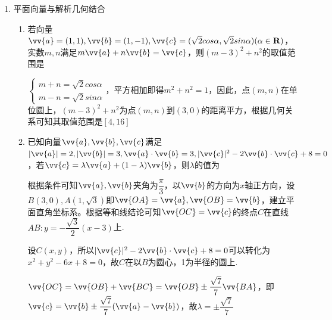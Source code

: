 \begin{enumerate}
\begin{enumerate}
\begin{jieda}
            $OM: y = \dfrac{2}{x_0}x$，故$y_H = \dfrac{2}{x_0}x_H$，故$x_0 = \dfrac{2x_H}{y_H}$，代入可得$x_H = \dfrac{8x_0}{4+x_0^2} = \dfrac{\dfrac{16x_H}{y_H}}{4+\left(\dfrac{2x_H}{y_H}\right)^2} = \dfrac{4x_Hy_H}{y_H^2 + x_H^2} (y_H \neq 0)$，即$x_H^2+y_H^2 - 4y_H = 0(y_H \neq 0)$，故轨迹方程为 ${x}^{2} + {\left( y - 2\right) }^{2} = 4\left( {y \neq  0}\right)$
        \end{jieda}
    \end{enumerate}

    \item 平面向量与解析几何结合
    \begin{enumerate}
        \item 若向量$\vv{a} = (1, 1), \vv{b} = (1, -1), \vv{c} = (\sqrt{2} cos\alpha, \sqrt{2}sin\alpha) (\alpha \in \mathbf{R})$，实数$m, n$满足$m \vv{a} + n \vv{b} = \vv{c}$，则$(m-3)^2+n^2$的取值范围是\blkda{$[4, 16]$}
        \begin{jieda}
            $\left \{ \begin{array}{l}
                 m+n = \sqrt{2}cos\alpha  \\
                 m-n = \sqrt{2}sin\alpha
            \end{array} \right.$，平方相加即得$m^2+n^2 = 1$，因此，点$(m,n)$在单位圆上，$(m-3)^2+n^2$为点$(m,n)$到$(3,0)$的距离平方，根据几何关系可知其取值范围是$[4, 16]$
        \end{jieda}
        
        \item 已知向量$\vv{a}, \vv{b}, \vv{c}$满足$|\vv{a}| = 2, |\vv{b}| = 3, \vv{a} \cdot \vv{b} = 3, |\vv{c}|^2 - 2\vv{b} \cdot \vv{c} + 8 = 0$，若$\vv{c} = \lambda \vv{a} + (1-\lambda) \vv{b}$，则$\lambda$的值为
        \begin{jieda}
            根据条件可知$\vv{a}, \vv{b}$夹角为$\dfrac{\pi}{3}$，以$\vv{b}$的方向为$x$轴正方向，设$B(3, 0), A(1, \sqrt{3})$即$\vv{OA} = \vv{a}, \vv{OB} = \vv{b}$，建立平面直角坐标系。根据等和线结论可知$\vv{OC} = \vv{c}$的终点$C$在直线$AB: y = -\dfrac{\sqrt{3}}{2}(x-3)$上.
            
            设$C(x, y)$，所以$|\vv{c}|^2 - 2\vv{b} \cdot \vv{c} + 8 = 0$可以转化为$x^2+y^2 - 6x + 8 = 0$，故$C$在以$B$为圆心，1为半径的圆上.
            
            $\vv{OC} = \vv{OB} + \vv{BC} = \vv{OB} \pm \dfrac{\sqrt{7}}{7}\vv{BA}$，即$\vv{c} = \vv{b} \pm \dfrac{\sqrt{7}}{7}(\vv{a} - \vv{b})$，故$\lambda = \pm \dfrac{\sqrt{7}}{7}$
        \end{jieda}


\end{enumerate}
\end{enumerate}
